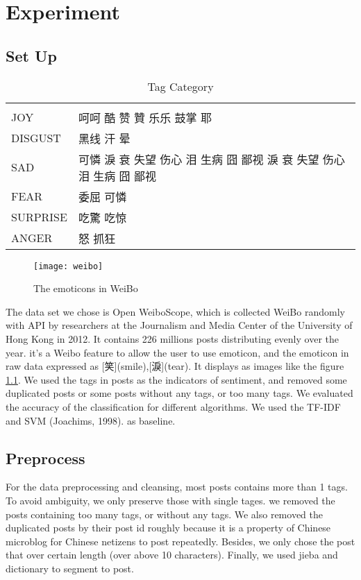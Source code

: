 \chapter{Experiment}

\section{Set Up}

\begin{table}[]
\centering
\caption{Tag Category}
\label{CategoryTable}
\begin{tabular}{ll}
      &  \\
JOY  & 呵呵 酷 赞 贊 乐乐 鼓掌 耶 \\
DISGUST & 黑线 汗 晕 \\
SAD &   可憐 淚 衰 失望 伤心 泪 生病 囧 鄙视  淚 衰 失望 伤心 泪 生病 囧 鄙视  \\
FEAR &  委屈  可憐 \\
SURPRISE &  吃驚 吃惊 \\
ANGER & 怒 抓狂
\end{tabular}
\end{table}

\begin{figure}[h]
    \centering
	\texttt{[image: weibo]}
    \caption{The emoticons in WeiBo}
    \label{fig:weibo}
\end{figure}

The data set we chose is Open WeiboScope\cite{fu2013reality}, which is collected WeiBo randomly with API by researchers at the Journalism and Media Center of the University of Hong Kong in 2012. 
It contains 226 millions posts distributing evenly over the year. 
it's a Weibo feature to allow the user to use emoticon, 
and the emoticon in raw data expressed as [笑](smile),[淚](tear). It displays as images like the figure \ref{fig:weibo}. 
We used the tags in posts as the indicators of sentiment, and removed some duplicated posts or some posts without any tags, or too many tags. 
We evaluated the accuracy of the classification for different algorithms. We used the TF-IDF and SVM (Joachims, 1998). as baseline.


\section{Preprocess}

For the data preprocessing and cleansing, most posts contains more than 1 tags. To avoid ambiguity, we only preserve those with single tages.
we removed the posts containing too many tags, or without any tags. We also removed the duplicated posts by their post id roughly because it is a property of Chinese microblog \cite{fu2013reality} for Chinese netizens to post repeatedly. 
Besides, we only chose the post that over certain length (over above 10 characters). Finally, we used jieba and dictionary to segment to post. \\

